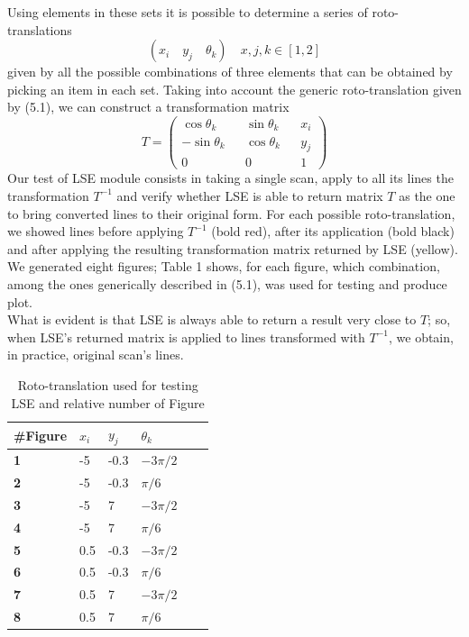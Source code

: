 \documentclass[a4paper, onecolumn]{report}
\begin{document}
Using elements in these sets it is possible to determine a series of roto-translations 
\begin{equation}
	(x_i \quad y_j \quad \theta_k) \quad x,j,k \in [1,2] 
\end{equation}
given by all the possible combinations of three elements that can be obtained by picking an item in each set. Taking into account the generic roto-translation given by (5.1), we can construct a transformation matrix
\begin{equation}
	T = \left(\begin{matrix}\cos\theta_k && \sin\theta_k && x_i \\ -\sin\theta_k && \cos\theta_k && y_j \\ 0 && 0 && 1\end{matrix}\right)
\end{equation}
Our test of LSE module consists in taking a single scan, apply to all its lines the transformation $T^{-1}$ and verify whether LSE is able to return matrix $T$ as the one to bring converted lines to their original form. For each possible roto-translation, we showed lines before applying $T^{-1}$ (bold red), after its application (bold black) and after applying the resulting transformation matrix returned by LSE (yellow). We generated eight figures; Table 1 shows, for each figure, which combination, among the ones generically described in (5.1), was used for testing and produce plot. \\
What is evident is that LSE is always able to return a result very close to $T$; so, when LSE's returned matrix is applied to lines transformed with $T^{-1}$, we obtain, in practice, original scan's lines.

\begin{center}
\begin{table}
    \begin{tabularx}{\textwidth}{@{}lYYYYY@{}}
  \hline
\textbf{\#Figure} & \textbf{$x_i$} & \textbf{$y_j$} & \textbf{$\theta_k$}\\ \hline
\textbf{1} & -5 & -0.3 & $-3\pi/2$ \\ \hline
\textbf{2} & -5 & -0.3 & $\pi/6$ \\ \hline
\textbf{3} & -5 & 7 & $-3\pi/2$ \\ \hline
\textbf{4} & -5 & 7 & $\pi/6$ \\ \hline
\textbf{5} & 0.5 & -0.3 & $-3\pi/2$ \\ \hline
\textbf{6} & 0.5 & -0.3 & $\pi/6$ \\ \hline
\textbf{7} & 0.5 & 7 & $-3\pi/2$ \\ \hline
\textbf{8} & 0.5 & 7 & $\pi/6$ \\ \hline
   \hline
    \end{tabularx}
\caption{Roto-translation used for testing LSE and relative number of Figure}
\end{table}
\end{center}
\end{document}

